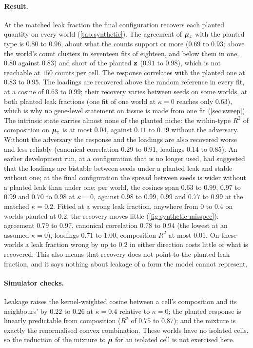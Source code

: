 \paragraph{Result.}  At the matched leak fraction the final configuration recovers each planted quantity on every world (\cref{tab:synthetic}). The agreement of $\boldsymbol{\mu}_z$ with the planted type is $0.80$ to $0.96$, about what the counts support or more ($0.69$ to $0.93$; above the world's count clusters in seventeen fits of eighteen, and below them in one, $0.80$ against $0.83$) and short of the planted $\mathbf{z}$ ($0.91$ to $0.98$), which is not reachable at $150$ counts per cell. The response correlates with the planted one at $0.83$ to $0.95$. The loadings are recovered above the random reference in every fit, at a cosine of $0.63$ to $0.99$; their recovery varies between seeds on some worlds, at both planted leak fractions (one fit of one world at $\kappa = 0$ reaches only $0.63$), which is why no gene-level statement on tissue is made from one fit (\cref{sec:sweep}). The intrinsic state carries almost none of the planted niche: the within-type $R^2$ of composition on $\boldsymbol{\mu}_z$ is at most $0.04$, against $0.11$ to $0.19$ without the adversary. Without the adversary the response and the loadings are also recovered worse and less reliably (canonical correlation $0.29$ to $0.91$, loadings $0.14$ to $0.85$). An earlier development run, at a configuration that is no longer used, had suggested that the loadings are bistable between seeds under a planted leak and stable without one; at the final configuration the spread between seeds is wider without a planted leak than under one: per world, the cosines span $0.63$ to $0.99$, $0.97$ to $0.99$ and $0.70$ to $0.98$ at $\kappa = 0$, against $0.98$ to $0.99$, $0.99$ and $0.77$ to $0.99$ at the matched $\kappa = 0.2$. Fitted at a wrong leak fraction, anywhere from $0$ to $0.4$ on worlds planted at $0.2$, the recovery moves little (\cref{fig:synthetic-misspec}): agreement $0.79$ to $0.97$, canonical correlation $0.78$ to $0.94$ (the lowest at an assumed $\kappa = 0$), loadings $0.71$ to $1.00$, composition $R^2$ at most $0.01$. On these worlds a leak fraction wrong by up to $0.2$ in either direction costs little of what is recovered. This also means that recovery does not point to the planted leak fraction, and it says nothing about leakage of a form the model cannot represent.

\paragraph{Simulator checks.} Leakage raises the kernel-weighted cosine between a cell's composition and its neighbours' by $0.22$ to $0.26$ at $\kappa = 0.4$ relative to $\kappa = 0$; the planted response is linearly predictable from composition ($R^2$ of $0.75$ to $0.87$); and the mixture is exactly the renormalised convex combination. These worlds have no isolated cells, so the reduction of the mixture to $\boldsymbol{\rho}$ for an isolated cell is not exercised here.


